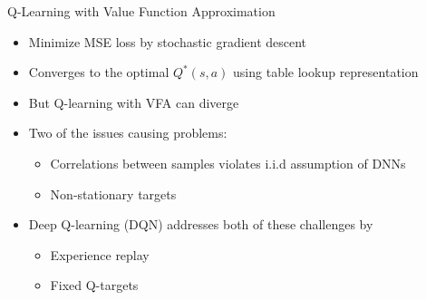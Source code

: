 \begin{frame}[c]{Q-Learning with Value Function Approximation}
	
	\begin{itemize}
		\item Minimize MSE loss by stochastic gradient descent
		\item Converges to the optimal $Q^*(s,a)$ using \alert{table lookup} representation
		\item But Q-learning with VFA can diverge
		\item Two of the issues causing problems:
		\begin{itemize}
			\item Correlations between samples violates i.i.d assumption of DNNs
			\item Non-stationary targets
		\end{itemize}
		\item Deep Q-learning (DQN) addresses both of these challenges by
		\begin{itemize}
			\item Experience replay
			\item Fixed Q-targets
		\end{itemize}
	\end{itemize}
	
\end{frame}
